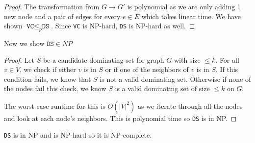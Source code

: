 \documentclass{article}
\begin{document}
\begin{proof}
    The transformation from $G \rightarrow G'$ is polynomial as we are only adding 1 new node and a pair of edges for every $e \in E$ which takes linear time.
    We have shown $\texttt{VC} \leq_p \texttt{DS}$. Since \texttt{VC} is NP-hard, \texttt{DS} is NP-hard as well.
\end{proof}

Now we show $\texttt{DS} \in NP$

\begin{proof}
    Let $S$ be a candidate dominating set for graph $G$ with size $\leq k$.
    For all $v \in V$, we check if either $v$ is in $S$ or if one of the neighbors of $v$ is in $S$.
    If this condition fails, we know that $S$ is not a valid dominating set.
    Otherwise if none of the nodes fail this check, we know $S$ is a valid dominating set of size $\leq k$ on $G$.
    
    The worst-case runtime for this is $O(|V|^2)$ as we iterate through all the nodes and look at each node's neighbors.
    This is polynomial time so \texttt{DS} is in NP.
\end{proof}

\texttt{DS} is in NP and is NP-hard so it is NP-complete.
\end{document}
